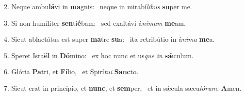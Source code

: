 2. Neque ambu\textbf{lá}vi in \textbf{ma}gnis: \ast\  neque in mirabí\textit{li}\textit{bus} \textbf{su}per me.\

3. Si non humíliter \textbf{sen}ti\textbf{é}bam: \ast\  sed exaltávi á\textit{ni}\textit{mam} \textbf{me}am.\

4. Sicut ablactátus est super \textbf{ma}tre \textbf{su}a: \ast\  ita retribútio in á\textit{ni}\textit{ma} \textbf{me}a.\

5. Speret Isra\textbf{ël} in \textbf{Dó}mino: \ast\  ex hoc nunc et us\textit{que} \textit{in} \textbf{sǽ}culum.\

6. Glória \textbf{Pa}tri, et \textbf{Fí}lio, \ast\  et Spirí\textit{tu}\textit{i} \textbf{Sanc}to.\

7. Sicut erat in princípio, et \textbf{nunc}, et \textbf{sem}per, \ast\  et in sǽcula sæcu\textit{ló}\textit{rum}. \textbf{A}men.\

